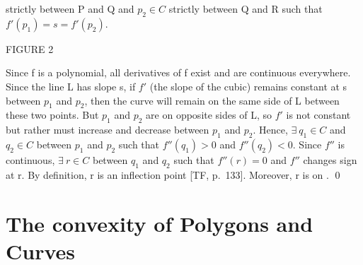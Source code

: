 strictly between P and Q and $p_{2} \in C$ strictly between Q and R
such that $f'(p_{1}) = s = f'(p_{2})$.
\begin{center}
FIGURE 2
\end{center}
Since f is a polynomial, all derivatives of f exist and are continuous
everywhere.  Since the line L has slope s, if $f'$ (the slope of the cubic)
remains constant at s between $p_{1}$ and $p_{2}$, then the curve
 will remain on the same side of L between these two points.
But $p_{1}$ and $p_{2}$ are on opposite sides of L, so $f'$ is not constant
but rather must increase and decrease between $p_{1}$ and $p_{2}$.
Hence, $\exists\ q_{1} \in C$ and $q_{2} \in C$ between $p_{1}$ and
$p_{2}$ such 
that $f''(q_{1}) > 0$ and $f''(q_{2}) < 0$.
\hence Since $f''$ is continuous, $\exists\ r \in C$ between $q_{1}$ and
$q_{2}$ such that $f''(r) = 0$ and $f''$ changes sign at r.
By definition, r is an inflection point [TF, p.\ 133].
Moreover, r is on .
\qed
\section{The convexity of Polygons and Curves}
